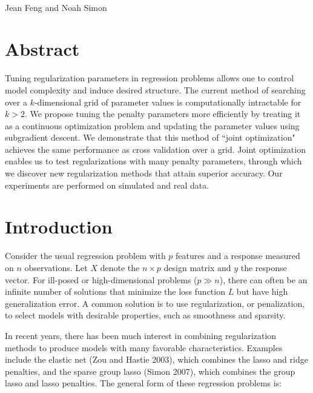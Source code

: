 \documentclass[10pt,letterpaper]{article}
\date{}
\begin{document}
\vspace*{0.35in}

\begin{flushleft}
{\Large
\textbf{}
}
\newline
\\
Jean Feng and Noah Simon
\\

\end{flushleft}
\section*{Abstract}
Tuning regularization parameters in regression problems allows one to control model complexity and induce desired structure. The current method of searching over a $k$-dimensional grid of parameter values is computationally intractable for $k>2$. We propose tuning the penalty parameters more efficiently by treating it as a continuous optimization problem and updating the parameter values using subgradient descent. We demonstrate that this method of ``joint optimization" achieves the same performance as cross validation over a grid. Joint optimization enables us to test regularizations with many penalty parameters, through which we discover new regularization methods that attain superior accuracy. Our experiments are performed on simulated and real data.

\section{Introduction}

Consider the usual regression problem with $p$ features and a response measured on $n$ observations. Let $X$ denote the $n \times p$ design matrix and $y$ the response vector. For ill-posed or high-dimensional problems ($p \gg n$), there can often be an infinite number of solutions that minimize the loss function $L$ but have high generalization error. A common solution is to use regularization, or penalization, to select models with desirable properties, such as smoothness and sparsity.

In recent years, there has been much interest in combining regularization methods to produce models with many favorable characteristics. Examples include the elastic net (Zou and Hastie 2003), which combines the lasso and ridge penalties, and the sparse group lasso (Simon 2007), which combines the group lasso and lasso penalties. The general form of these regression problems is:
\end{document}
